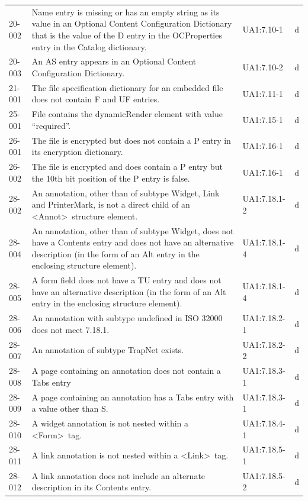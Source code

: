 \documentclass{book}
\begin{document}
\begin{tabular}{lp{5cm}lp{5cm}}
  20-002 & Name entry is missing or has an empty string as its value in an Optional Content Configuration Dictionary that is the value of the D entry in the OCProperties entry in the Catalog dictionary. & UA1:7.10-1 & d\\
  20-003 & An AS entry appears in an Optional Content Configuration Dictionary. & UA1:7.10-2 & d\\
  21-001 & The file specification dictionary for an embedded file does not contain F and UF entries. & UA1:7.11-1 & d\\
  25-001 & File contains the dynamicRender element with value “required”. & UA1:7.15-1 & d\\
  26-001 & The file is encrypted but does not contain a P entry in its encryption dictionary. & UA1:7.16-1 & d\\
  26-002 & The file is encrypted and does contain a P entry but the 10th bit position of the P entry is false. & UA1:7.16-1 & d\\
  28-002 & An annotation, other than of subtype Widget, Link and PrinterMark, is not a direct child of an \textless Annot\textgreater\ structure element. & UA1:7.18.1-2 & d\\
  28-004 & An annotation, other than of subtype Widget, does not have a Contents entry and does not have an alternative description (in the form of an Alt entry in the enclosing structure element). & UA1:7.18.1-4 & d\\
  28-005 & A form field does not have a TU entry and does not have an alternative description (in the form of an Alt entry in the enclosing structure element). & UA1:7.18.1-4 & d\\
  28-006 & An annotation with subtype undefined in ISO 32000 does not meet 7.18.1. & UA1:7.18.2-1 & d\\
  28-007 & An annotation of subtype TrapNet exists. & UA1:7.18.2-2 & d\\
  28-008 & A page containing an annotation does not contain a Tabs entry & UA1:7.18.3-1 & d\\
  28-009 & A page containing an annotation has a Tabs entry with a value other than S. & UA1:7.18.3-1 & d\\
  28-010 & A widget annotation is not nested within a \textless Form\textgreater\ tag. & UA1:7.18.4-1 & d\\
  28-011 & A link annotation is not nested within a \textless Link\textgreater\ tag. & UA1:7.18.5-1 & d\\
  28-012 & A link annotation does not include an alternate description in its Contents entry. & UA1:7.18.5-2 & d\\

\end{tabular}
\end{document}
